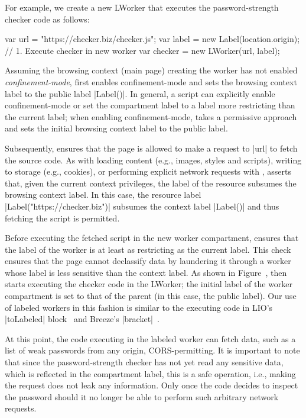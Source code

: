 For example, we create a new LWorker that executes the
password-strength checker code as follows:
\begin{jscode}
var url = "https://checker.biz/checker.js";
var label = new Label(location.origin);
// 1. Execute checker in new worker
var checker = new LWorker(url, label);
\end{jscode}
%
Assuming the browsing context (main page) creating the worker has not
enabled \emph{confinement-mode}, \sys{} first enables confinement-mode
and sets the browsing context label to the public label \js|Label()|.
%
In general, a script can explicitly enable confinement-mode or set
the compartment label to a label more restricting than the current
label; when enabling confinement-mode, \sys{} takes a
permissive approach and sets the initial browsing context label to the
public label.
 
Subsequently, \sys{} ensures that the page is allowed to make
a request to \js|url| to fetch the source code.
%
As with loading content (e.g., images, styles and scripts), writing to
storage (e.g., cookies), or performing explicit network requests with
\xhr{}, \sys{} asserts that, given the current context privileges, the
label of the resource subsumes the browsing context label.
%
In this case, the resource label \js|Label("https://checker.biz")|
subsumes the context label \js|Label()| and thus fetching the script
is permitted.

Before executing the fetched script in the new worker compartment, \sys{}
ensures that the label of the worker is at least as restricting as the
current label.
%
This check ensures that the page cannot declassify data by laundering
it through a worker whose label is less sensitive than the context
label.
%
\iffigures
\ifcompletefigures
As shown in Figure~, 
\fi
\fi
\sys{} then starts
executing the checker code in the LWorker; the initial label of the
worker compartment is set to that of the parent (in this case, the
public label).
%
Our use of labeled workers in this fashion is similar to the executing code in
LIO's \js|toLabeled| block~\cite{stefan:2011:flexible} and Breeze's
\js|bracket|~\cite{Breeze13}.
 
At this point, the code executing in the labeled worker can fetch
data, such as a list of weak passwords from any origin,
CORS-permitting.
%
It is important to note that since the password-strength checker has
not yet read any sensitive data, which is reflected in the compartment
label, this is a safe operation, i.e., making the request does not
leak any information.
%
Only once the code decides to inspect the password should it no
longer be able to perform such arbitrary network requests.

